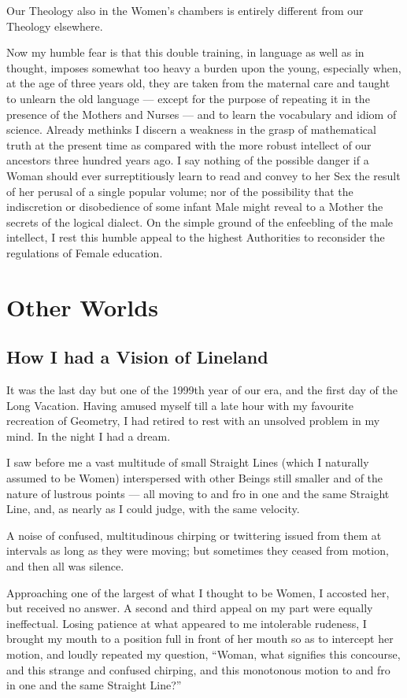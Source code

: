 \documentclass[10pt, kindle, oneside]{kindle}
\begin{document}
Our Theology also in the Women's chambers is entirely different from our
Theology elsewhere.

Now my humble fear is that this double training, in language as well as in
thought, imposes somewhat too heavy a burden upon the young, especially when,
at the age of three years old, they are taken from the maternal care and
taught to unlearn the old language --- except for the purpose of repeating it in
the presence of the Mothers and Nurses --- and to learn the vocabulary and idiom
of science. Already methinks I discern a weakness in the grasp of mathematical
truth at the present time as compared with the more robust intellect of our
ancestors three hundred years ago. I say nothing of the possible danger if a
Woman should ever surreptitiously learn to read and convey to her Sex the
result of her perusal of a single popular volume; nor of the possibility that
the indiscretion or disobedience of some infant Male might reveal to a Mother
the secrets of the logical dialect. On the simple ground of the enfeebling of
the male intellect, I rest this humble appeal to the highest Authorities to
reconsider the regulations of Female education.


\part{Other Worlds}
\chapter{How I had a Vision of Lineland}


It was the last day but one of the 1999th year of our era, and the first day
of the Long Vacation. Having amused myself till a late hour with my favourite
recreation of Geometry, I had retired to rest with an unsolved problem in my
mind. In the night I had a dream.

I saw before me a vast multitude of small Straight Lines (which I naturally
assumed to be Women) interspersed with other Beings still smaller and of the
nature of lustrous points --- all moving to and fro in one and the same Straight
Line, and, as nearly as I could judge, with the same velocity.

A noise of confused, multitudinous chirping or twittering issued from them at
intervals as long as they were moving; but sometimes they ceased from motion,
and then all was silence.

Approaching one of the largest of what I thought to be Women, I accosted her,
but received no answer. A second and third appeal on my part were equally
ineffectual. Losing patience at what appeared to me intolerable rudeness, I
brought my mouth to a position full in front of her mouth so as to intercept
her motion, and loudly repeated my question, ``Woman, what signifies this
concourse, and this strange and confused chirping, and this monotonous motion
to and fro in one and the same Straight Line?''
\end{document}
